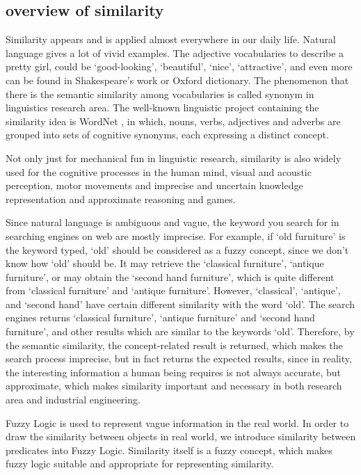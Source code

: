 \subsection{overview of similarity}
\label{sec:overview}
Similarity appears and is applied almost everywhere in our daily life. Natural language gives a lot of vivid examples. The adjective vocabularies to describe a pretty girl, could be `good-looking', `beautiful', `nice', `attractive', and even more can be found in Shakespeare's work or Oxford dictionary. The phenomenon that there is the semantic similarity among vocabularies is called synonym in linguistics research area. The well-known linguistic project containing the similarity idea is WordNet \cite{Fel98}, in which, nouns, verbs, adjectives and adverbs are grouped into sets of cognitive synonyms, each expressing a distinct concept. 

Not only just for mechanical fun in linguistic research, similarity is also widely used for the cognitive processes in the human mind, visual and acoustic perception, motor movements and imprecise and uncertain knowledge representation and approximate reasoning and games.

Since natural language is ambiguous and vague, the keyword you search for in searching engines on web are mostly imprecise. For example, if `old furniture' is the keyword typed, `old' should be considered as a fuzzy concept, since we don't know how `old' should be. It may retrieve the `classical furniture', `antique furniture', or may obtain the `second hand furniture', which is quite different from `classical furniture' and `antique furniture'. However, `classical', `antique', and `second hand' have certain different similarity with the word `old'. The search engines returns `classical furniture', `antique furniture' and `second hand furniture', and other results which are similar to the keywords `old'. Therefore, by the semantic similarity, the concept-related result is returned, which makes the search process imprecise, but in fact returns the expected results, since in reality, the interesting information a human being requires is not always accurate, but approximate, which makes similarity important and necessary in both research area and industrial engineering. 

Fuzzy Logic is used to represent vague information in the real world. In order to draw the similarity between objects in real world, we introduce similarity between predicates into Fuzzy Logic. Similarity itself is a fuzzy concept, which makes fuzzy logic suitable and appropriate for representing similarity. 

